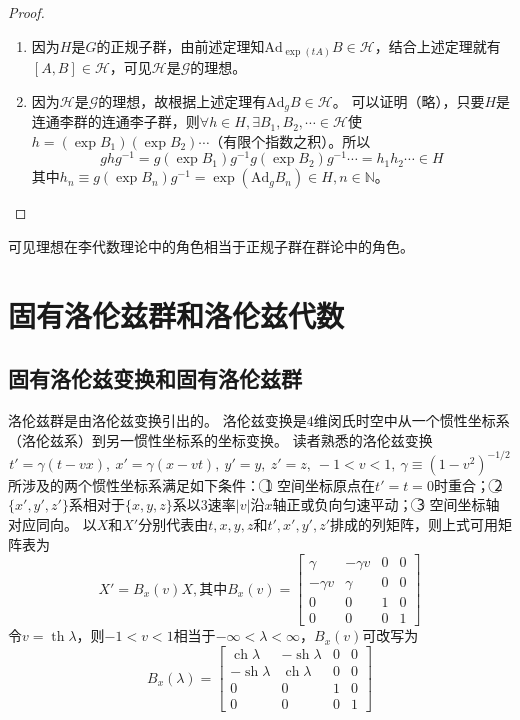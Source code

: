 \begin{proof}
    \begin{enumerate}[（A）]
        \item 因为$H$是$G$的正规子群，由前述定理知$\mathrm{Ad}_{\exp(tA)}B \in \mathscr{H}$，结合上述定理就有$[A, B] \in \mathscr{H}$，可见$\mathscr{H}$是$\mathscr{G}$的理想。
        \item 因为$\mathscr{H}$是$\mathscr{G}$的理想，故根据上述定理有$\mathrm{Ad}_gB \in \mathscr{H}$。
        可以证明（略），只要$H$是连通李群的连通李子群，则$\forall h \in H, \exists B_1, B_2, \cdots \in \mathscr{H}$使$h=(\exp B_1)(\exp B_2)\cdots$（有限个指数之积）。所以
        $$ghg^{-1} = g(\exp B_1)g^{-1}g(\exp B_2)g^{-1}\cdots = h_1h_2\cdots\in H$$
        其中$h_n \equiv g(\exp B_n)g^{-1} = \exp(\mathrm{Ad}_gB_n) \in H, n \in \mathbb{N}$。
    \end{enumerate}
\end{proof}

\begin{note}
    可见理想在李代数理论中的角色相当于正规子群在群论中的角色。
\end{note}

\iffalse

\section{固有洛伦兹群和洛伦兹代数}

\subsection{固有洛伦兹变换和固有洛伦兹群}

洛伦兹群是由洛伦兹变换引出的。
洛伦兹变换是$4$维闵氏时空中从一个惯性坐标系（洛伦兹系）到另一惯性坐标系的坐标变换。
读者熟悉的洛伦兹变换
$$t' = \gamma(t - vx), ~ x' = \gamma(x - vt), ~ y' = y, ~ z' = z, ~ -1 < v < 1, ~ \gamma \equiv (1 - v^2)^{-1 / 2}$$
所涉及的两个惯性坐标系满足如下条件：
\textcircled{1} 空间坐标原点在$t' = t = 0$时重合；
\textcircled{2} $\{x', y', z'\}$系相对于$\{x, y, z\}$系以$3$速率$|v|$沿$x$轴正或负向匀速平动；
\textcircled{3} 空间坐标轴对应同向。
以$X$和$X'$分别代表由$t, x, y, z$和$t', x', y', z'$排成的列矩阵，则上式可用矩阵表为
$$X' = B_x(v)X, \text{其中} B_x(v) = \begin{bmatrix}
    \gamma & -\gamma v & 0 & 0 \\
    -\gamma v & \gamma & 0 & 0 \\
    0 & 0 & 1 & 0 \\
    0 & 0 & 0 & 1
\end{bmatrix}$$
令$v = \operatorname{th}\lambda$，则$-1 < v < 1$相当于$-\infty < \lambda < \infty$，$B_x(v)$可改写为
$$B_x(\lambda) = \begin{bmatrix}
    \operatorname{ch}\lambda & -\operatorname{sh}\lambda & 0 & 0 \\
    -\operatorname{sh}\lambda & \operatorname{ch}\lambda & 0 & 0 \\
    0 & 0 & 1 & 0 \\
    0 & 0 & 0 & 1
\end{bmatrix}$$

